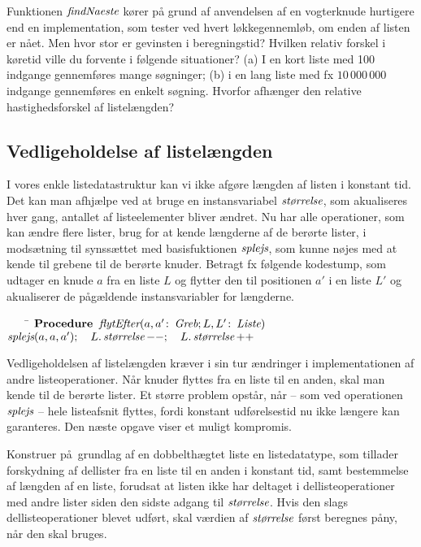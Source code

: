   \begin{exerc}
    Funktionen $\varname{findNaeste}$ kører på grund af anvendelsen af en vogterknude hurtigere end en implementation, som tester ved hvert løkkegennemløb, om enden af listen er nået.
    Men hvor stor er gevinsten i beregningstid?
    Hvilken relativ forskel i køretid ville du forvente i følgende situationer? 
    (a) I en kort liste med 100 indgange gennemføres mange søgninger;
    (b) i en lang liste med fx $10\,000\,000$ indgange gennemføres en enkelt søgning.
    Hvorfor afhænger den relative hastighedsforskel af listelængden?
  \end{exerc}
  
  \subsection*{Vedligeholdelse af listelængden}

  I vores enkle listedatastruktur kan vi ikke afgøre længden af listen i konstant tid.
  Det kan man afhjælpe ved at bruge en instansvariabel $\size$, som akualiseres hver gang, antallet af listeelementer bliver ændret.
  Nu har alle operationer, som kan ændre flere lister, brug for at kende længderne af de berørte lister, i modsætning til synssættet med basisfuktionen $\splice$, som kunne nøjes med at kende til grebene til de berørte knuder.
  Betragt fx følgende kodestump, som udtager en knude $a$ fra en liste $L$ og flytter den til positionen $a'$ i en liste $L'$ og akualiserer de pågældende instansvariabler for længderne.

  \begin{tabbing}
~~~~\=\kill
    $\Procedure \moveAfter (a, a'\colon \Handle ; L,L'\colon \List)$\\
    \> $\splice(a,a,a'); \quad L.\size--; \quad L.\size++$
 \end{tabbing}
 
 Vedligeholdelsen af listelængden kræver i sin tur ændringer i implementationen af andre listeoperationer.
 Når knuder flyttes fra en liste til en anden, skal man kende til de berørte lister.
 Et større problem opstår, når -- som ved operationen $\splice$ -- hele listeafsnit flyttes, fordi konstant udførelsestid nu ikke længere kan garanteres.
 Den næste opgave viser et muligt kompromis.

 \begin{exerc}
   Konstruer på grundlag af en dobbelthægtet liste en listedatatype, som tillader forskydning af dellister fra en liste til en anden i konstant tid, samt bestemmelse af længden af en liste, forudsat at listen ikke har deltaget i dellisteoperationer med andre lister siden den sidste adgang til $\size$.
   Hvis den slags dellisteoperationer blevet udført, skal værdien af $\size$ først beregnes påny, når den skal bruges.
 \end{exerc}
 

